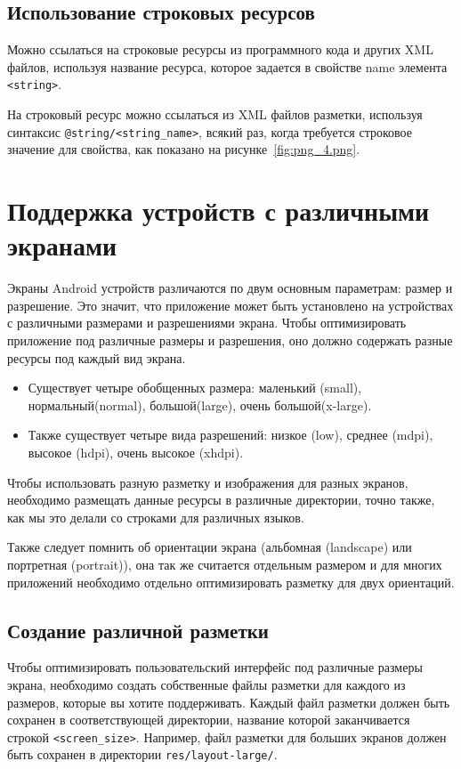 \subsection{Использование строковых ресурсов}
Можно ссылаться на строковые ресурсы из программного кода и других
XML файлов, используя название ресурса, которое задается в свойстве name
элемента \texttt{<string>}.\par
На строковый ресурс можно ссылаться из XML файлов разметки,
используя синтаксис \texttt{@string/<string\_name>}, всякий раз,
когда требуется строковое значение для свойства, как показано
на рисунке~\ref{fig:png_4.png}.

\section{Поддержка устройств с различными экранами}
Экраны Android устройств различаются по двум основным параметрам:
размер и разрешение.
Это значит, что приложение
может быть установлено на устройствах с различными размерами и
разрешениями экрана.
Чтобы оптимизировать приложение под различные
размеры и разрешения, оно должно содержать разные ресурсы под каждый
вид экрана.

\begin{itemize}
	\item Существует четыре обобщенных размера: маленький (small),
		нормальный(normal), большой(large), очень большой(x-large).
	\item Также существует четыре вида разрешений: низкое (low), среднее
		(mdpi), высокое (hdpi), очень высокое (xhdpi).
\end{itemize}

Чтобы использовать разную разметку и изображения для разных экранов,
необходимо размещать данные ресурсы в различные директории, точно
также, как мы это делали со строками для различных языков.\par
Также следует помнить об ориентации экрана (альбомная (landscape) или
портретная (portrait)), она так же считается отдельным размером и для
многих приложений необходимо отдельно оптимизировать разметку для
двух ориентаций.

\subsection{Создание различной разметки}
Чтобы оптимизировать пользовательский интерфейс под различные размеры
экрана, необходимо создать собственные файлы разметки для каждого из
размеров, которые вы хотите поддерживать.
Каждый файл разметки должен
быть сохранен в соответствующей директории, название которой
заканчивается строкой \texttt{<screen\_size>}.
Например, файл разметки для
больших экранов должен быть сохранен в директории \texttt{res/layout-large/}.

